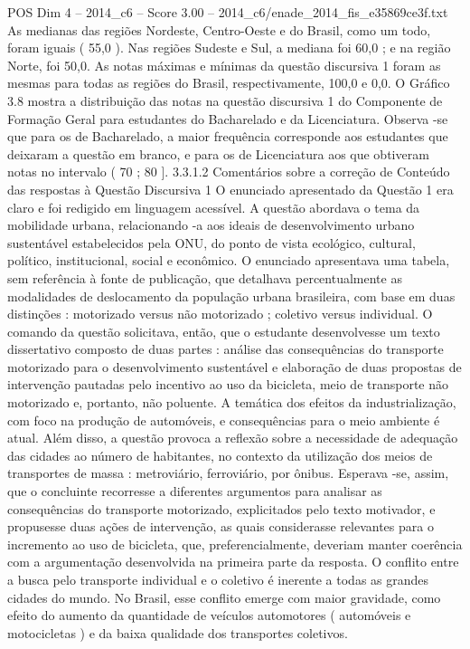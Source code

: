 \begin{textsample}{POS Dim 4 – 2014\_c6 – Score 3.00 – 2014\_c6/enade\_2014\_fis\_e35869ce3f.txt}
As medianas das regiões Nordeste, Centro-Oeste e do Brasil, como um todo, foram iguais ( 55,0 ).
Nas regiões Sudeste e Sul, a mediana foi 60,0 ; e na região Norte, foi 50,0.
As notas máximas e mínimas da questão discursiva 1 foram as mesmas para todas as regiões do Brasil, respectivamente, 100,0 e 0,0.
O Gráfico 3.8 mostra a distribuição das notas na questão discursiva 1 do Componente de Formação Geral para estudantes do Bacharelado e da Licenciatura.
Observa -se que para os de Bacharelado, a maior frequência corresponde aos estudantes que deixaram a questão em branco, e para os de Licenciatura aos que obtiveram notas no intervalo ( 70 ; 80 ]. 3.3.1.2 Comentários sobre a correção de Conteúdo das respostas à Questão Discursiva 1 O enunciado apresentado da Questão 1 era claro e foi redigido em linguagem acessível.
A questão abordava o tema da mobilidade urbana, relacionando -a aos ideais de desenvolvimento urbano sustentável estabelecidos pela ONU, do ponto de vista ecológico, cultural, político, institucional, social e econômico.
O enunciado apresentava uma tabela, sem referência à fonte de publicação, que detalhava percentualmente as modalidades de deslocamento da população urbana brasileira, com base em duas distinções : motorizado versus não motorizado ; coletivo versus individual.
O comando da questão solicitava, então, que o estudante desenvolvesse um texto dissertativo composto de duas partes : análise das consequências do transporte motorizado para o desenvolvimento sustentável e elaboração de duas propostas de intervenção pautadas pelo incentivo ao uso da bicicleta, meio de transporte não motorizado e, portanto, não poluente.
A temática dos efeitos da industrialização, com foco na produção de automóveis, e consequências para o meio ambiente é atual.
Além disso, a questão provoca a reflexão sobre a necessidade de adequação das cidades ao número de habitantes, no contexto da utilização dos meios de transportes de massa : metroviário, ferroviário, por ônibus.
Esperava -se, assim, que o concluinte recorresse a diferentes argumentos para analisar as consequências do transporte motorizado, explicitados pelo texto motivador, e propusesse duas ações de intervenção, as quais considerasse relevantes para o incremento ao uso de bicicleta, que, preferencialmente, deveriam manter coerência com a argumentação desenvolvida na primeira parte da resposta.
O conflito entre a busca pelo transporte individual e o coletivo é inerente a todas as grandes cidades do mundo.
No Brasil, esse conflito emerge com maior gravidade, como efeito do aumento da quantidade de veículos automotores ( automóveis e motocicletas ) e da baixa qualidade dos transportes coletivos.

\end{textsample}
